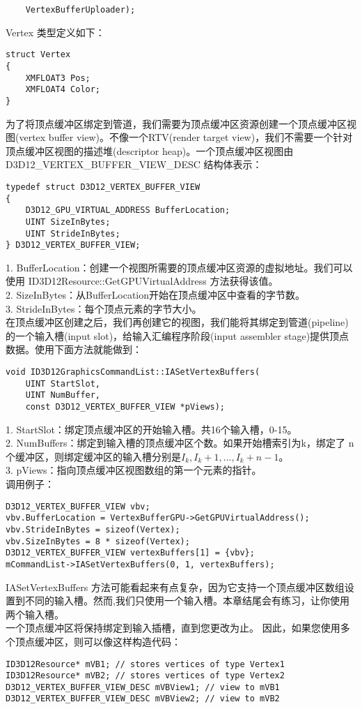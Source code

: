 \begin{flushleft}
\begin{lstlisting}
    VertexBufferUploader);
\end{lstlisting}
Vertex 类型定义如下：\\
\begin{lstlisting}
struct Vertex
{
    XMFLOAT3 Pos;
    XMFLOAT4 Color;
}
\end{lstlisting}
为了将顶点缓冲区绑定到管道，我们需要为顶点缓冲区资源创建一个顶点缓冲区视图(vertex buffer view)。不像一个RTV(render target view)，我们不需要一个针对顶点缓冲区视图的描述堆(descriptor heap)。一个顶点缓冲区视图由 D3D12\_VERTEX\_BUFFER\_VIEW\_DESC 结构体表示：\\
\begin{lstlisting}
typedef struct D3D12_VERTEX_BUFFER_VIEW
{
    D3D12_GPU_VIRTUAL_ADDRESS BufferLocation;
    UINT SizeInBytes;
    UINT StrideInBytes;
} D3D12_VERTEX_BUFFER_VIEW;
\end{lstlisting}
1. BufferLocation：创建一个视图所需要的顶点缓冲区资源的虚拟地址。我们可以使用 ID3D12Resource::GetGPUVirtualAddress 方法获得该值。\\
2. SizeInBytes：从BufferLocation开始在顶点缓冲区中查看的字节数。 \\
3. StrideInBytes：每个顶点元素的字节大小。\\
在顶点缓冲区创建之后，我们再创建它的视图，我们能将其绑定到管道(pipeline)的一个输入槽(input slot)，给输入汇编程序阶段(input assembler stage)提供顶点数据。使用下面方法就能做到：\\
\begin{lstlisting}
void ID3D12GraphicsCommandList::IASetVertexBuffers(
    UINT StartSlot,
    UINT NumBuffer,
    const D3D12_VERTEX_BUFFER_VIEW *pViews);
\end{lstlisting}
1. StartSlot：绑定顶点缓冲区的开始输入槽。共16个输入槽，0-15。\\
2. NumBuffers：绑定到输入槽的顶点缓冲区个数。如果开始槽索引为k，绑定了 n 个缓冲区，则绑定缓冲区的输入槽分别是$I_{k},I_{k}+1,...,I_{k}+n-1$。\\
3. pViews：指向顶点缓冲区视图数组的第一个元素的指针。\\
调用例子：\\
\begin{lstlisting}
D3D12_VERTEX_BUFFER_VIEW vbv;
vbv.BufferLocation = VertexBufferGPU->GetGPUVirtualAddress();
vbv.StrideInBytes = sizeof(Vertex);
vbv.SizeInBytes = 8 * sizeof(Vertex);
D3D12_VERTEX_BUFFER_VIEW vertexBuffers[1] = {vbv};
mCommandList->IASetVertexBuffers(0, 1, vertexBuffers);
\end{lstlisting}
IASetVertexBuffers 方法可能看起来有点复杂，因为它支持一个顶点缓冲区数组设置到不同的输入槽。然而,我们只使用一个输入槽。本章结尾会有练习，让你使用两个输入槽。\\
一个顶点缓冲区将保持绑定到输入插槽，直到您更改为止。 因此，如果您使用多个顶点缓冲区，则可以像这样构造代码：\\
\begin{lstlisting}
ID3D12Resource* mVB1; // stores vertices of type Vertex1
ID3D12Resource* mVB2; // stores vertices of type Vertex2
D3D12_VERTEX_BUFFER_VIEW_DESC mVBView1; // view to mVB1
D3D12_VERTEX_BUFFER_VIEW_DESC mVBView2; // view to mVB2


\end{lstlisting}
\end{flushleft}
